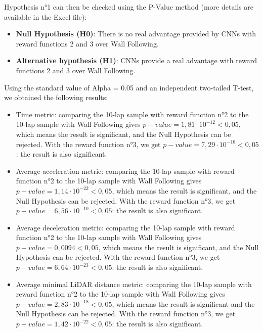 Hypothesis n°1 can then be checked using the P-Value method (more details are available in the Excel file): \\

\begin{itemize}
	\item \textbf{Null Hypothesis (H0)}: There is no real advantage provided by CNNs with reward functions 2 and 3 over Wall Following. 
	\item \textbf{Alternative hypothesis (H1)}: CNNs provide a real advantage with reward functions 2 and 3 over Wall Following.
\end{itemize}

Using the standard value of Alpha = 0.05 and an independent two-tailed T-test, we obtained the following results:

\begin{itemize}
	\item Time metric: comparing the 10-lap sample with reward function n°2 to the 10-lap sample with Wall Following gives $p-value=1,81 \cdot 10^{-12}<0,05$, which means the result is significant, and the Null Hypothesis can be rejected. With the reward function n°3, we get $p-value=7,29 \cdot 10^{-16}<0,05$: the result is also significant.
	\item Average acceleration metric: comparing the 10-lap sample with reward function n°2 to the 10-lap sample with Wall Following gives $p-value=1,14 \cdot 10^{-22}<0,05$, which means the result is significant, and the Null Hypothesis can be rejected. With the reward function n°3, we get $p-value=6,56 \cdot 10^{-10}<0,05$: the result is also significant.
	\item Average deceleration metric: comparing the 10-lap sample with reward function n°2 to the 10-lap sample with Wall Following gives $p-value=0,0094<0,05$, which means the result is significant, and the Null Hypothesis can be rejected. With the reward function n°3, we get $p-value=6,64 \cdot 10^{-23}<0,05$: the result is also significant.
	\item Average minimal LiDAR distance metric: comparing the 10-lap sample with reward function n°2 to the 10-lap sample with Wall Following gives $p-value=2,83 \cdot 10^{-18}<0,05$, which means the result is significant and the Null Hypothesis can be rejected. With the reward function n°3, we get $p-value=1,42 \cdot 10^{-22}<0,05$: the result is also significant.
\end{itemize} 

